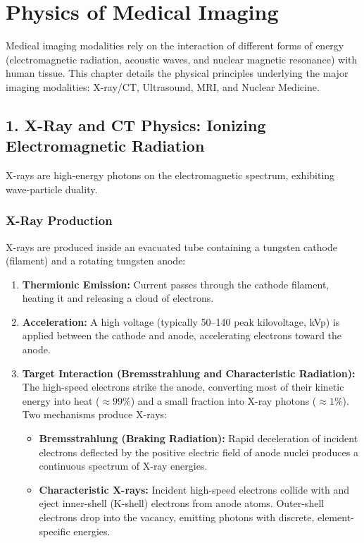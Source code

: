 \chapter{Physics of Medical Imaging}

\label{ch:physics}

Medical imaging modalities rely on the interaction of different forms of energy (electromagnetic radiation, acoustic waves, and nuclear magnetic resonance) with human tissue. This chapter details the physical principles underlying the major imaging modalities: X-ray/CT, Ultrasound, MRI, and Nuclear Medicine.


\section*{1. X-Ray and CT Physics: Ionizing Electromagnetic Radiation}
X-rays are high-energy photons on the electromagnetic spectrum, exhibiting wave-particle duality.

\subsection*{X-Ray Production}
X-rays are produced inside an evacuated tube containing a tungsten cathode (filament) and a rotating tungsten anode:
\begin{enumerate}
    \item \textbf{Thermionic Emission:} Current passes through the cathode filament, heating it and releasing a cloud of electrons.
    \item \textbf{Acceleration:} A high voltage (typically 50--140 peak kilovoltage, kVp) is applied between the cathode and anode, accelerating electrons toward the anode.
    \item \textbf{Target Interaction (Bremsstrahlung and Characteristic Radiation):} The high-speed electrons strike the anode, converting most of their kinetic energy into heat ($\approx 99\%$) and a small fraction into X-ray photons ($\approx 1\%$). Two mechanisms produce X-rays:
    \begin{itemize}
        \item \textbf{Bremsstrahlung (Braking Radiation):} Rapid deceleration of incident electrons deflected by the positive electric field of anode nuclei produces a continuous spectrum of X-ray energies.
        \item \textbf{Characteristic X-rays:} Incident high-speed electrons collide with and eject inner-shell (K-shell) electrons from anode atoms. Outer-shell electrons drop into the vacancy, emitting photons with discrete, element-specific energies.
    \end{itemize}
\end{enumerate}

